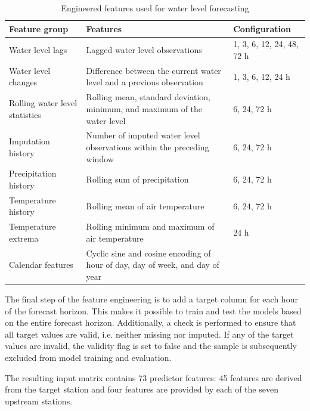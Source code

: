 \begin{table}[htbp]
    \centering
    \begin{tabularx}{\textwidth}{@{}lXl@{}}
        \toprule
        \textbf{Feature group} & \textbf{Features} & \textbf{Configuration} \\
        \midrule
        Water level lags
        & Lagged water level observations
        & 1, 3, 6, 12, 24, 48, 72 h \\
        \addlinespace
        Water level changes
        & Difference between the current water level and a previous observation
        & 1, 3, 6, 12, 24 h \\
        \addlinespace
        Rolling water level statistics
        & Rolling mean, standard deviation, minimum, and maximum of the water level
        & 6, 24, 72 h \\
        \addlinespace
        Imputation history
        & Number of imputed water level observations within the preceding window
        & 6, 24, 72 h \\
        \addlinespace
        Precipitation history
        & Rolling sum of precipitation
        & 6, 24, 72 h \\
        \addlinespace
        Temperature history
        & Rolling mean of air temperature
        & 6, 24, 72 h \\
        \addlinespace
        Temperature extrema
        & Rolling minimum and maximum of air temperature
        & 24 h \\
        \addlinespace
        Calendar features
        & Cyclic sine and cosine encoding of hour of day, day of week, and day of year
        &  \\
        \bottomrule
    \end{tabularx}
    \caption{Engineered features used for water level forecasting}\label{tab:engineered-features}
\end{table}
The final step of the feature engineering is to add a target column for each hour of the forecast horizon. This makes it possible to train and test the models based on the entire forecast horizon. Additionally, a check is performed to ensure that all target values are valid, i.e. neither missing nor imputed. If any of the target values are invalid, the validity flag is set to false and the sample is subsequently excluded from model training and evaluation.

The resulting input matrix contains 73 predictor features: 45 features are derived from the target station and four features are provided by each of the seven upstream stations.
